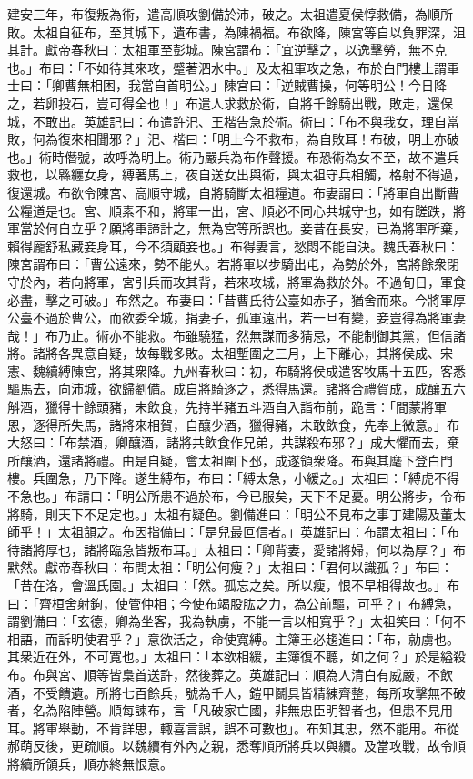 \begin{pinyinscope}
建安三年，布復叛為術，遣高順攻劉備於沛，破之。太祖遣夏侯惇救備，為順所敗。太祖自征布，至其城下，遺布書，為陳禍福。布欲降，陳宮等自以負罪深，沮其計。獻帝春秋曰：太祖軍至彭城。陳宮謂布：「宜逆擊之，以逸擊勞，無不克也。」布曰：「不如待其來攻，蹙著泗水中。」及太祖軍攻之急，布於白門樓上謂軍士曰：「卿曹無相困，我當自首明公。」陳宮曰：「逆賊曹操，何等明公！今日降之，若卵投石，豈可得全也！」布遣人求救於術，自將千餘騎出戰，敗走，還保城，不敢出。英雄記曰：布遣許汜、王楷告急於術。術曰：「布不與我女，理自當敗，何為復來相聞邪？」汜、楷曰：「明上今不救布，為自敗耳！布破，明上亦破也。」術時僭號，故呼為明上。術乃嚴兵為布作聲援。布恐術為女不至，故不遣兵救也，以緜纏女身，縛著馬上，夜自送女出與術，與太祖守兵相觸，格射不得過，復還城。布欲令陳宮、高順守城，自將騎斷太祖糧道。布妻謂曰：「將軍自出斷曹公糧道是也。宮、順素不和，將軍一出，宮、順必不同心共城守也，如有蹉跌，將軍當於何自立乎？願將軍諦計之，無為宮等所誤也。妾昔在長安，已為將軍所棄，賴得龐舒私藏妾身耳，今不須顧妾也。」布得妻言，愁悶不能自決。魏氏春秋曰：陳宮謂布曰：「曹公遠來，勢不能乆。若將軍以步騎出屯，為勢於外，宮將餘衆閉守於內，若向將軍，宮引兵而攻其背，若來攻城，將軍為救於外。不過旬日，軍食必盡，擊之可破。」布然之。布妻曰：「昔曹氏待公臺如赤子，猶舍而來。今將軍厚公臺不過於曹公，而欲委全城，捐妻子，孤軍遠出，若一旦有變，妾豈得為將軍妻哉！」布乃止。術亦不能救。布雖驍猛，然無謀而多猜忌，不能制御其黨，但信諸將。諸將各異意自疑，故每戰多敗。太祖塹圍之三月，上下離心，其將侯成、宋憲、魏續縛陳宮，將其衆降。九州春秋曰：初，布騎將侯成遣客牧馬十五匹，客悉驅馬去，向沛城，欲歸劉備。成自將騎逐之，悉得馬還。諸將合禮賀成，成釀五六斛酒，獵得十餘頭豬，未飲食，先持半豬五斗酒自入詣布前，跪言：「間蒙將軍恩，逐得所失馬，諸將來相賀，自釀少酒，獵得豬，未敢飲食，先奉上微意。」布大怒曰：「布禁酒，卿釀酒，諸將共飲食作兄弟，共謀殺布邪？」成大懼而去，棄所釀酒，還諸將禮。由是自疑，會太祖圍下邳，成遂領衆降。布與其麾下登白門樓。兵圍急，乃下降。遂生縛布，布曰：「縛太急，小緩之。」太祖曰：「縛虎不得不急也。」布請曰：「明公所患不過於布，今已服矣，天下不足憂。明公將步，令布將騎，則天下不足定也。」太祖有疑色。劉備進曰：「明公不見布之事丁建陽及董太師乎！」太祖頷之。布因指備曰：「是兒最叵信者。」英雄記曰：布謂太祖曰：「布待諸將厚也，諸將臨急皆叛布耳。」太祖曰：「卿背妻，愛諸將婦，何以為厚？」布默然。獻帝春秋曰：布問太祖：「明公何瘦？」太祖曰：「君何以識孤？」布曰：「昔在洛，會溫氏園。」太祖曰：「然。孤忘之矣。所以瘦，恨不早相得故也。」布曰：「齊桓舍射鉤，使管仲相；今使布竭股肱之力，為公前驅，可乎？」布縛急，謂劉備曰：「玄德，卿為坐客，我為執虜，不能一言以相寬乎？」太祖笑曰：「何不相語，而訴明使君乎？」意欲活之，命使寬縛。主簿王必趨進曰：「布，勍虜也。其衆近在外，不可寬也。」太祖曰：「本欲相緩，主簿復不聽，如之何？」於是縊殺布。布與宮、順等皆梟首送許，然後葬之。英雄記曰：順為人清白有威嚴，不飲酒，不受饋遺。所將七百餘兵，號為千人，鎧甲鬬具皆精練齊整，每所攻擊無不破者，名為陷陣營。順每諫布，言「凡破家亡國，非無忠臣明智者也，但患不見用耳。將軍舉動，不肯詳思，輙喜言誤，誤不可數也」。布知其忠，然不能用。布從郝萌反後，更疏順。以魏續有外內之親，悉奪順所將兵以與續。及當攻戰，故令順將續所領兵，順亦終無恨意。


\end{pinyinscope}
